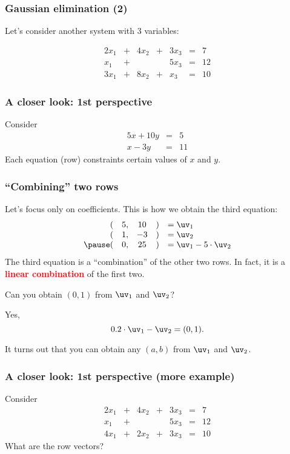 \begin{frame}
  \frametitle{Gaussian elimination (2)}
  Let's consider another system with 3 variables:

  \[
  \begin{array}{rcrcrcl}
    2x_1 & + & 4x_2 & + & 3x_3 & = & 7 \\
    x_1 & + &  &  & 5x_3 & = & 12 \\
    3x_1 & + & 8x_2 & + & x_3 & = & 10
  \end{array}
  \]

  \vspace{2in}

\end{frame}

\begin{frame}
  \frametitle{A closer look: 1st perspective}

  Consider
  \[
  \begin{array}{rcl}
  5x + 10y &=& 5 \\
  x - 3y &=& 11
  \end{array}
  \]
  Each equation (row) constraints certain values of $x$ and $y$.
  \vspace{2.5in}
\end{frame}

\begin{frame}
  \frametitle{``Combining'' two rows}
  Let's focus only on coefficients.
  This is how we obtain the third equation:
  \[
  \begin{array}{rccll}
    ( & 5, & 10 & ) & =\uv_1\\
    ( & 1, & -3 & ) & =\uv_2\\
    \pause
    ( & 0, & 25 & ) & =\uv_1 - 5\cdot \uv_2
  \end{array}
  \]
  \pause
  The third equation is a ``combination'' of the other two rows.  In fact, it is a \textcolor{red}{\bf linear combination} of the first two.
  \pause
  
  Can you obtain $(0,1)$ from $\uv_1$ and $\uv_2$?
  \pause
  
  Yes,
  \[
  0.2\cdot \uv_1 -\uv_2 = (0,1).
  \]
  
  It turns out that you can obtain any $(a,b)$ from $\uv_1$ and $\uv_2$.
\end{frame}

\begin{frame}
  \frametitle{A closer look: 1st perspective (more example)}

  Consider
  \[
  \begin{array}{rcrcrcl}
    2x_1 & + & 4x_2 & + & 3x_3 & = & 7 \\
    x_1 & + &  &  & 5x_3 & = & 12 \\
    4x_1 & + & 2x_2 & + & 3x_3 & = & 10
  \end{array}
  \]
  What are the row vectors?

  \vspace{2in}
\end{frame}


